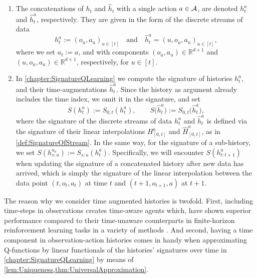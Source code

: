 \documentclass[
    a4paper,
    11pt,
    bibliography=totoc,
    listof=totoc,      
    headinclude=true,
    cleardoublepage=empty,
]{scrbook}
\theoremstyle{plain}
\theoremstyle{definition}
\theoremstyle{remark}
\newcommand{\SetR}{\mathbb R}
\newcommand{\SpaceA}{{\cal A}}
\newcommand{\SpaceO}{{\cal O}}
\newcommand{\SpaceH}{{\cal H}}
\begin{document}
\begin{enumerate}
    \item The concatenations of $h_t$ and $\hat h_t$ with a single action 
    $a\in\SpaceA$, are denoted $h_t^a$ and $\hat h_t^a$, respectively. They 
    are given in the form of the discrete streams of data
    \[
        h_t^a := (o_u, a_u)_{u\in[t]}
        \quad \text{and} \quad \hat{h}^a_t = (u,o_u, a_u)_{u\in[t]},
    \]
    where we set $a_t := a$, and with components $(o_u,a_u)\in\SetR^{d+1}$
    and $(u, o_u,a_u)\in\SetR^{d+1}$, respectively, for $u \in [t]$.    
    
    \item In \cref{chapter:SignatureQLearning} we compute the signature
    of histories $h_t^a$, and their time-augmentations $\hat{h}^a_t$. 
    Since the history as argument already includes the time index, we omit it 
    in the signature, and set
    \[
        S(h^a_t) := S_{0,t}(h^a_t),
        \qquad
        S\bigl(\hat{h}^a_t\bigr) := S_{0,t}\bigl(\hat{h}^a_t\bigr),        
    \]
    where the signature of the discrete streams of data $h_t^a$ and 
    $\hat{h}^a_t$ is defined via the signature of their linear 
    interpolations $H^a_{[0,t]}$ and $\hat{H}^a_{[0,t]}$, as in 
    \cref{def:SignatureOfStream}. In the same way, for the signature of a 
    sub-history, we set $S(h^{a_u}_{s:u}) := S_{s:u}(h^a_t)$. Specifically, 
    we will encounter $S(h^a_{t:t+1})$ when updating the signature of a 
    concatenated history after new data has arrived, which is simply the 
    signature of the linear interpolation between the data point 
    $(t,o_t,a_t)$ at time $t$ and $(t+1,o_{t+1},a)$ at $t+1$.
    
\end{enumerate}

The reason why we consider time augmented histories is twofold. First,
including time-steps in observations creates time-aware agents which, have 
shown superior performance compared to their time-unaware counterparts in 
finite-horizon reinforcement learning tasks in a variety of 
methods \cite{pardo2018_tlrl}. And second, having a time component in 
observation-action histories comes in handy when approximating 
Q-functions by linear functionals of the histories' signatures 
over time in \cref{chapter:SignatureQLearning} by means of
\cref{lem:Uniqueness,thm:UniversalApproximation}.

\end{document}
